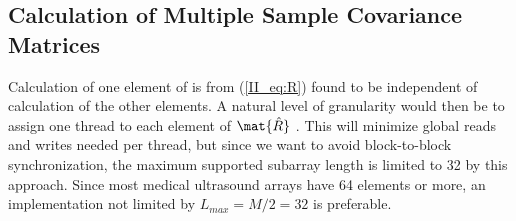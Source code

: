 


\subsection{Calculation of Multiple Sample Covariance Matrices}\label{II_sec:calcR}


Calculation of one element of \R is from (\ref{II_eq:R}) found to be independent of calculation of the other elements. A natural level of granularity would then be to assign one thread to each element of $\mat{\hat{R}}$ \cite{Chen2011}. This will minimize global reads and writes needed per thread, but since we want to avoid block-to-block synchronization, the maximum supported subarray length is limited to 32 by this approach. Since most medical ultrasound arrays have 64 elements or more, an implementation not limited by $L_{max}=M/2=32$ is preferable.

